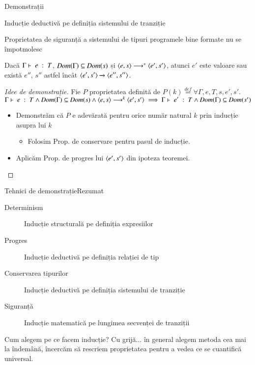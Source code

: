 \documentclass[xcolor=pdftex,romanian,colorlinks,handout]{beamer}
\begin{document}
\begin{section}{Demonstrații}
\begin{subsection}{Inducție deductivă pe definiția sistemului de tranziție}
\end{subsection}


\begin{frame}{Proprietatea de siguranță a sistemului de tipuri}
{programele bine formate nu se împotmolesc}
\begin{theorem}
Dacă ${\displaystyle \Gamma\vdash \; e \; : \; T}$, $\mathop{\it Dom}(\Gamma) \subseteq \mathop{\it Dom}(s)$ și ${{\langle{e,s}\rangle}}\longrightarrow^\ast{{\ensuremath \langle{e',s'}\rangle}}$, atunci $e'$ este valoare sau există $e''$, $s''$ astfel încât $\displaystyle{\ensuremath {{\langle{e',s'}\rangle}} \xrightarrow{} {{\ensuremath \langle{e'',s''}\rangle}}}$.
\end{theorem}


\begin{proof}[Idee de demonstrație]
 Fie $P$ proprietatea definită de 
\(P(k) \stackrel{def}{=} \forall \Gamma,e,T,s,e',s'. \)
\({\displaystyle \Gamma\vdash \; e \; : \; T} \wedge \mathop{\it Dom}(\Gamma)\subseteq\mathop{\it Dom}(s) \wedge {{\ensuremath \langle{e,s}\rangle}}\longrightarrow^k{{\langle{e',s'}\rangle}} \implies {\displaystyle \Gamma\vdash \; e' \; : \; T} \wedge \mathop{\it Dom}(\Gamma)\subseteq\mathop{\it Dom}(s')\)
\begin{itemize}
\item Demonstrăm că $P$ e adevărată pentru orice număr natural $k$ prin inducție asupra lui $k$ 
\begin{itemize}
\item Folosim Prop. de conservare pentru pasul de inducție.
\end{itemize}
\item Aplicăm Prop. de progres lui ${\langle{e',s'}\rangle}$ din ipoteza teoremei.
\end{itemize}
\end{proof}

\end{frame}

\begin{frame}{Tehnici de demonstrație}{Rezumat}
\begin{description}
\item[Determinism] Inducție structurală pe definiția expresiilor 
\item[Progres] Inducție deductivă pe definiția relației de tip 
\item[Conservarea tipurilor] Inducție deductivă pe definiția sistemului de tranziție 
\item[Siguranță] Inducție matematică pe lungimea secvenței de tranziții 
\end{description}

\begin{block}{Cum alegem pe ce facem inducție?}
Cu grijă... în general alegem metoda cea mai la îndemână, încercăm să rescriem proprietatea pentru a vedea ce se cuantifică universal.
\end{block}
\end{frame}


\end{section}
\end{document}
